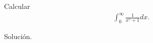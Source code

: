 \begin{homeworkProblem}
  Calcular
  \begin{align*}
    \int_{0}^{\infty}\frac{1}{x^5+1}dx.
  \end{align*}
  \begin{solution}
    Solución. 
  \end{solution}
\end{homeworkProblem}
